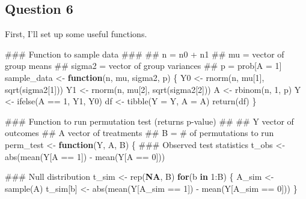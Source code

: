 \documentclass[
  11pt,
  letterpaper,
  DIV=11,
  numbers=noendperiod]{scrartcl}
\newenvironment{Shaded}{}{}
\newcommand{\ConstantTok}[1]{\textcolor[rgb]{0.69,0.38,0.53}{\textbf{#1}}}
\newcommand{\ControlFlowTok}[1]{\textcolor[rgb]{0.80,0.14,0.11}{\textbf{#1}}}
\newcommand{\DecValTok}[1]{\textcolor[rgb]{0.96,0.45,0.00}{#1}}
\newcommand{\DocumentationTok}[1]{\textcolor[rgb]{0.60,0.59,0.10}{#1}}
\newcommand{\FunctionTok}[1]{\textcolor[rgb]{0.41,0.62,0.42}{#1}}
\newcommand{\NormalTok}[1]{\textcolor[rgb]{0.24,0.22,0.21}{#1}}
\newcommand{\OtherTok}[1]{\textcolor[rgb]{0.41,0.62,0.42}{#1}}
\newcommand{\SpecialCharTok}[1]{\textcolor[rgb]{0.69,0.38,0.53}{#1}}
\newcommand{\StringTok}[1]{\textcolor[rgb]{0.60,0.59,0.10}{#1}}
\begin{document}
\hypertarget{question-6}{%
\subsection{Question 6}\label{question-6}}

First, I'll set up some useful functions.

\begin{Shaded}
\begin{Highlighting}[]
\DocumentationTok{\#\#\# Function to sample data}
\DocumentationTok{\#\#\#}
\DocumentationTok{\#\# n = n0 + n1}
\DocumentationTok{\#\# mu = vector of group means}
\DocumentationTok{\#\# sigma2 = vector of group variances}
\DocumentationTok{\#\# p = prob[A = 1]}
\NormalTok{sample\_data }\OtherTok{\textless{}{-}} \ControlFlowTok{function}\NormalTok{(n, mu, sigma2, p) \{}
\NormalTok{  Y0 }\OtherTok{\textless{}{-}} \FunctionTok{rnorm}\NormalTok{(n, mu[}\DecValTok{1}\NormalTok{], }\FunctionTok{sqrt}\NormalTok{(sigma2[}\DecValTok{1}\NormalTok{]))}
\NormalTok{  Y1 }\OtherTok{\textless{}{-}} \FunctionTok{rnorm}\NormalTok{(n, mu[}\DecValTok{2}\NormalTok{], }\FunctionTok{sqrt}\NormalTok{(sigma2[}\DecValTok{2}\NormalTok{]))}
\NormalTok{  A }\OtherTok{\textless{}{-}} \FunctionTok{rbinom}\NormalTok{(n, }\DecValTok{1}\NormalTok{, p)}
\NormalTok{  Y }\OtherTok{\textless{}{-}} \FunctionTok{ifelse}\NormalTok{(A }\SpecialCharTok{==} \DecValTok{1}\NormalTok{, Y1, Y0)}
\NormalTok{  df }\OtherTok{\textless{}{-}} \FunctionTok{tibble}\NormalTok{(}\StringTok{\textquotesingle{}Y\textquotesingle{}} \OtherTok{=}\NormalTok{ Y,}
               \StringTok{\textquotesingle{}A\textquotesingle{}} \OtherTok{=}\NormalTok{ A)}
  \FunctionTok{return}\NormalTok{(df)}
\NormalTok{\}}

\DocumentationTok{\#\#\# Function to run permutation test (returns p{-}value)}
\DocumentationTok{\#\#}
\DocumentationTok{\#\# Y vector of outcomes}
\DocumentationTok{\#\# A vector of treatments}
\DocumentationTok{\#\# B = \# of permutations to run}
\NormalTok{perm\_test }\OtherTok{\textless{}{-}} \ControlFlowTok{function}\NormalTok{(Y, A, B) \{}
  \DocumentationTok{\#\#\# Observed test statistics}
\NormalTok{  t\_obs }\OtherTok{\textless{}{-}} \FunctionTok{abs}\NormalTok{(}\FunctionTok{mean}\NormalTok{(Y[A }\SpecialCharTok{==} \DecValTok{1}\NormalTok{]) }\SpecialCharTok{{-}} \FunctionTok{mean}\NormalTok{(Y[A }\SpecialCharTok{==} \DecValTok{0}\NormalTok{]))}
  
  \DocumentationTok{\#\#\# Null distribution }
\NormalTok{  t\_sim }\OtherTok{\textless{}{-}} \FunctionTok{rep}\NormalTok{(}\ConstantTok{NA}\NormalTok{, B) }
  \ControlFlowTok{for}\NormalTok{(b }\ControlFlowTok{in} \DecValTok{1}\SpecialCharTok{:}\NormalTok{B) \{}
\NormalTok{    A\_sim }\OtherTok{\textless{}{-}} \FunctionTok{sample}\NormalTok{(A) }
\NormalTok{    t\_sim[b] }\OtherTok{\textless{}{-}} \FunctionTok{abs}\NormalTok{(}\FunctionTok{mean}\NormalTok{(Y[A\_sim }\SpecialCharTok{==} \DecValTok{1}\NormalTok{]) }\SpecialCharTok{{-}} \FunctionTok{mean}\NormalTok{(Y[A\_sim }\SpecialCharTok{==} \DecValTok{0}\NormalTok{]))}
\NormalTok{  \}}
  

\end{Highlighting}
\end{Shaded}
\end{document}

